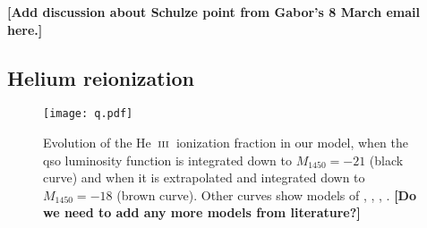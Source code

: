 \documentclass[a4paper,fleqn,usenatbib]{mnras}
\newcommand{\gk}[1]{{\bf \color{notecolor} [#1]}}
\def\HeIII{\hbox{He~$\scriptstyle\rm III$}}
\def\HeIII{\hbox{He~$\scriptstyle\rm III$}}
\begin{document}
\gk{Add discussion about Schulze point from Gabor's 8 March email
  here.}

\subsection{Helium reionization}

\begin{figure}
  \begin{center}
    \texttt{[image: q.pdf]}
  \end{center}
  \caption{Evolution of the \HeIII\ ionization fraction in our model,
    when the qso luminosity function is integrated down to
    $M_{1450}=-21$ (black curve) and when it is extrapolated and
    integrated down to $M_{1450}=-18$ (brown curve).  Other curves
    show models of \citet[solid grey]{2012ApJ...746..125H},
    \citet[dashed grey]{2015ApJ...813L...8M}, \citet[light blue and
      shaded region]{2016ApJ...828...90L},
    \citet[blue]{2018arXiv180104931P}. \gk{Do we need to add any more
      models from literature?}}
\end{figure}
\end{document}
